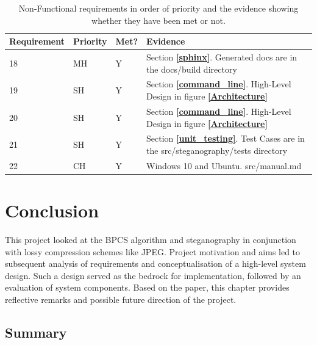 \documentclass{l4proj}
\begin{document}
\begin{table}[!h]
\centering
\caption{Non-Functional requirements in order of priority and the evidence showing whether they have been met or not.}
\label{table:meet_requirements_non_functional}
\begin{tabular}{@{}llll@{}}
\toprule
Requirement & Priority & Met? & Evidence                         \\ \midrule
18          & MH       & Y    & Section \textbf{\ref{sphinx}}. Generated docs are in the docs/build directory\\
19          & SH       & Y    & Section \textbf{\ref{command_line}}. High-Level Design in figure \textbf{\ref{Architecture}} \\
20          & SH       & Y    & Section \textbf{\ref{command_line}}. High-Level Design in figure \textbf{\ref{Architecture}} \\
21          & SH       & Y    & Section \textbf{\ref{unit_testing}}. Test Cases are in the src/steganography/tests directory\\
22          & CH       & Y    & Windows 10 and Ubuntu. src/manual.md            \\\bottomrule     
\end{tabular}
\end{table}


\chapter{Conclusion}    

This project looked at the BPCS algorithm and steganography in conjunction with lossy compression schemes like JPEG. Project motivation and aims led to subsequent analysis of requirements and conceptualisation of a high-level system design. Such a design served as the bedrock for implementation, followed by an evaluation of system components. Based on the paper, this chapter provides reflective remarks and possible future direction of the project.

\section{Summary}
\end{document}
